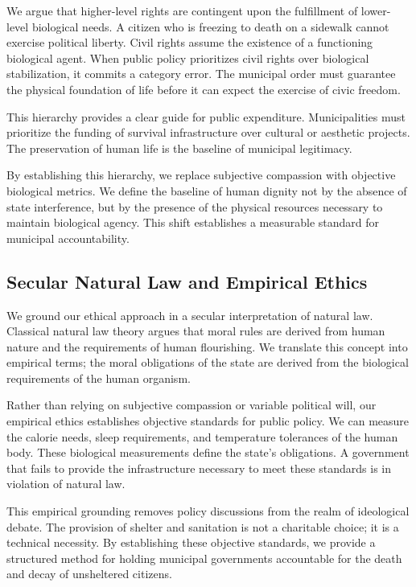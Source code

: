 \documentclass[12pt]{article}
\begin{document}
We argue that higher-level rights are contingent upon the fulfillment of lower-level biological needs. A citizen who is freezing to death on a sidewalk cannot exercise political liberty. Civil rights assume the existence of a functioning biological agent. When public policy prioritizes civil rights over biological stabilization, it commits a category error. The municipal order must guarantee the physical foundation of life before it can expect the exercise of civic freedom.

This hierarchy provides a clear guide for public expenditure. Municipalities must prioritize the funding of survival infrastructure over cultural or aesthetic projects. The preservation of human life is the baseline of municipal legitimacy.

By establishing this hierarchy, we replace subjective compassion with objective biological metrics. We define the baseline of human dignity not by the absence of state interference, but by the presence of the physical resources necessary to maintain biological agency. This shift establishes a measurable standard for municipal accountability.

\subsection{Secular Natural Law and Empirical Ethics}
We ground our ethical approach in a secular interpretation of natural law. Classical natural law theory argues that moral rules are derived from human nature and the requirements of human flourishing. We translate this concept into empirical terms; the moral obligations of the state are derived from the biological requirements of the human organism.

Rather than relying on subjective compassion or variable political will, our empirical ethics establishes objective standards for public policy. We can measure the calorie needs, sleep requirements, and temperature tolerances of the human body. These biological measurements define the state's obligations. A government that fails to provide the infrastructure necessary to meet these standards is in violation of natural law.

This empirical grounding removes policy discussions from the realm of ideological debate. The provision of shelter and sanitation is not a charitable choice; it is a technical necessity. By establishing these objective standards, we provide a structured method for holding municipal governments accountable for the death and decay of unsheltered citizens.
\end{document}
